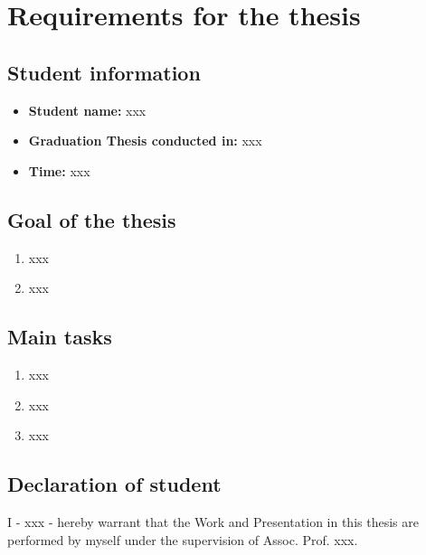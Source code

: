 \chapter*{Requirements for the thesis}
\section*{Student information}

\begin{itemize}
\item \textbf{Student name:} xxx
\item \textbf{Graduation Thesis conducted in:} xxx
\item \textbf{Time:} xxx
\end{itemize}
\section*{Goal of the thesis}
\begin{enumerate}
	\item xxx
	\item xxx
\end{enumerate}

\section*{Main tasks}
\begin{enumerate}
	\item xxx
	\item xxx
	\item xxx


\end{enumerate}

\pagebreak

\section*{Declaration of student}
I - xxx - hereby warrant that the Work and Presentation in this thesis are
performed by myself under the supervision of Assoc. Prof. xxx.

